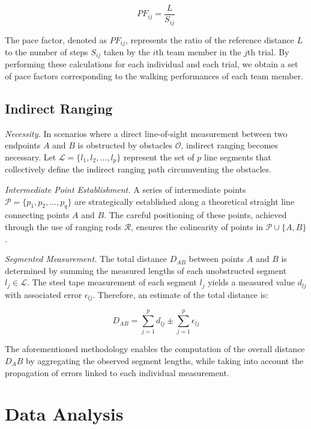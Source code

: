 \documentclass[12pt]{article}
\begin{document}
\[PF_{ij} = \frac{L}{S_{ij}}\]

The pace factor, denoted as \(PF_{ij}\), represents the ratio of the reference distance \(L\) to the number of steps \(S_{ij}\) taken by the \(i\)th team member in the \(j\)th trial. By performing these calculations for each individual and each trial, we obtain a set of pace factors corresponding to the walking performances of each team member.


\subsection*{Indirect Ranging}

\textit{Necessity.}  In scenarios where a direct line-of-sight measurement between two endpoints $A$ and $B$ is obstructed by obstacles $\mathcal{O}$, indirect ranging becomes necessary.  Let $\mathcal{L} = \{l_1, l_2, \dots, l_p\}$ represent the set of $p$ line segments that collectively define the indirect ranging path circumventing the obstacles.


\vspace{5mm}

\textit{Intermediate Point Establishment.} A series of intermediate points $\mathcal{P} = \{p_1, p_2, \dots, p_q\}$ are strategically established along a theoretical straight line connecting points $A$ and $B$. The careful positioning of these points, achieved through the use of ranging rods $\mathcal{R}$, ensures the colinearity of points in $\mathcal{P} \cup \{A, B\}$.

\vspace{5mm}
\textit{Segmented Measurement.}  The total distance $D_{AB}$ between points $A$ and $B$ is determined by summing the measured lengths of each unobstructed segment $l_j \in \mathcal{L}$.  The steel tape measurement of each segment $l_j$ yields a measured value $d_{lj}$ with associated error $\epsilon_{lj}$.  Therefore, an estimate of the total distance is:

$$D_{AB} = \sum_{j=1}^{p} d_{lj} \pm \sum_{j=1}^{p} \epsilon_{lj}$$

The aforementioned methodology enables the computation of the overall distance $D_AB$ by aggregating the observed segment lengths, while taking into account the propagation of errors linked to each individual measurement. 
\newpage
\section*{Data Analysis}
\end{document}
